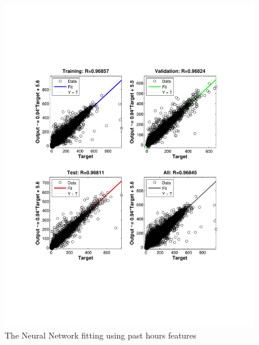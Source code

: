 \documentclass{sig-alternate}
\begin{document}
\begin{figure}[ht]
\centering
\includegraphics[scale = 0.4, trim = 300 150 300 150]{pic/reg1.pdf}
\caption{The Neural Network fitting using past hours features}
\end{figure}
\end{document}
